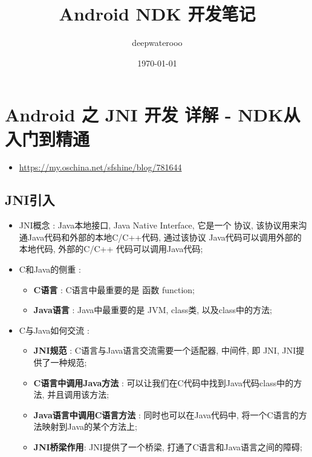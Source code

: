 \documentclass[9pt, b5paper]{article}
\author{deepwaterooo}
\date{\today}
\title{Android NDK 开发笔记}
\begin{document}
\maketitle
\tableofcontents


\section{Android 之 JNI 开发 详解 - NDK从入门到精通}
\label{sec-1}
\begin{itemize}
\item \url{https://my.oschina.net/sfshine/blog/781644}
\end{itemize}
\subsection{JNI引入}
\label{sec-1-1}
\begin{itemize}
\item JNI概念 : Java本地接口, Java Native Interface, 它是一个 协议, 该协议用来沟通Java代码和外部的本地C/C++代码, 通过该协议 Java代码可以调用外部的本地代码, 外部的C/C++ 代码可以调用Java代码;
\item C和Java的侧重 : 
\begin{itemize}
\item \textbf{C语言} : C语言中最重要的是 函数 function;
\item \textbf{Java语言} : Java中最重要的是 JVM, class类, 以及class中的方法;
\end{itemize}
\item C与Java如何交流 : 
\begin{itemize}
\item \textbf{JNI规范} : C语言与Java语言交流需要一个适配器, 中间件, 即 JNI, JNI提供了一种规范;
\item \textbf{C语言中调用Java方法} : 可以让我们在C代码中找到Java代码class中的方法, 并且调用该方法;
\item \textbf{Java语言中调用C语言方法} : 同时也可以在Java代码中, 将一个C语言的方法映射到Java的某个方法上;
\item \textbf{JNI桥梁作用}: JNI提供了一个桥梁, 打通了C语言和Java语言之间的障碍;
\end{itemize}
\end{itemize}
\end{document}
